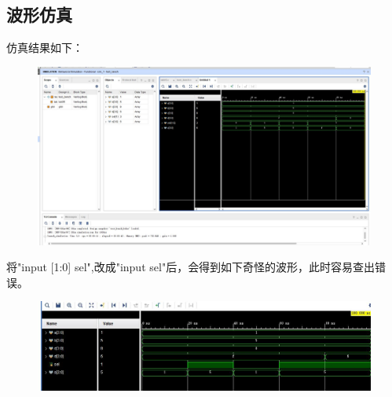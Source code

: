 \documentclass[UTF8]{article}
\begin{document}
	\subsection{波形仿真}
	仿真结果如下：\par
	\begin{figure}[H]
		\centering
		\includegraphics[width=1\linewidth]{s5.jpg}
		\label{s5}
	\end{figure}\par
	将"input [1:0] sel",改成"input sel"后，会得到如下奇怪的波形，此时容易查出错误。
	\begin{figure}[H]
		\centering
		\includegraphics[width=1\linewidth]{s5_2.jpg}
		\label{s5_2}
	\end{figure}\par
\end{document}
